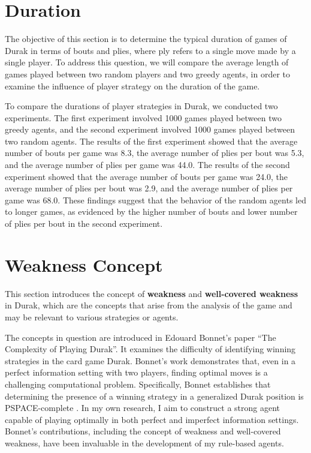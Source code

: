 \section{Duration}

The objective of this section is to determine the typical duration of games of Durak in terms of bouts and plies, where ply refers to a single move made by a single player. To address this question, we will compare the average length of games played between two random players and two greedy agents, in order to examine the influence of player strategy on the duration of the game.

To compare the durations of player strategies in Durak, we conducted two experiments. The first experiment involved 1000 games played between two greedy agents, and the second experiment involved 1000 games played between two random agents. The results of the first experiment showed that the average number of bouts per game was 8.3, the average number of plies per bout was 5.3, and the average number of plies per game was 44.0. The results of the second experiment showed that the average number of bouts per game was 24.0, the average number of plies per bout was 2.9, and the average number of plies per game was 68.0. These findings suggest that the behavior of the random agents led to longer games, as evidenced by the higher number of bouts and lower number of plies per bout in the second experiment.

\section{Weakness Concept}
\label{weaknessConcept}
This section introduces the concept of \textbf{weakness} and \textbf{well-covered weakness} in Durak, which are the concepts that arise from the analysis of the game and may be relevant to various strategies or agents.

The concepts in question are introduced in Edouard Bonnet's paper ``The Complexity of Playing Durak''. It examines the difficulty of identifying winning strategies in the card game Durak. Bonnet's work demonstrates that, even in a perfect information setting with two players, finding optimal moves is a challenging computational problem. Specifically, Bonnet establishes that determining the presence of a winning strategy in a generalized Durak position is PSPACE-complete \citep{Bonnet2016TheCO}. In my own research, I aim to construct a strong agent capable of playing optimally in both perfect and imperfect information settings. Bonnet's contributions, including the concept of weakness and well-covered weakness, have been invaluable in the development of my rule-based agents.

